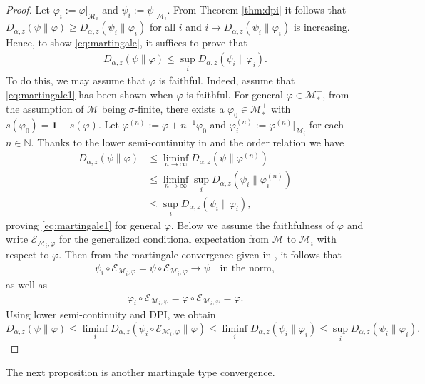 \documentclass[12pt]{article}
\theoremstyle{definition}
\theoremstyle{remark}
\numberwithin{equation}{section}
\def\cE{\mathcal E}
\def\cM{\mathcal M}
\def\ffi{\varphi}
\def\1{\mathbf{1}}
\def\bN{\mathbb{N}}
\begin{document}
\begin{proof}
Let $\ffi_i:=\ffi|_{\cM_i}$ and $\psi_i:=\psi|_{\cM_i}$. From Theorem \ref{thm:dpi} it follows that
$D_{\alpha,z}(\psi\|\ffi)\ge D_{\alpha,z}(\psi_i\|\ffi_i)$ for all $i$ and
$i\mapsto D_{\alpha,z}(\psi_i\|\ffi_i)$ is increasing. Hence, to show \eqref{eq:martingale}, it suffices to
prove that
\begin{align}\label{eq:martingale1}
D_{\alpha,z}(\psi\|\ffi)\le\sup_iD_{\alpha,z}(\psi_i\|\ffi_i).
\end{align}
To do this, we may assume that $\ffi$ is faithful. Indeed, assume that
\eqref{eq:martingale1} has been shown when $\ffi$ is
faithful. For general $\ffi\in\cM_*^+$, from the assumption of $\cM$ being $\sigma$-finite, there exists
a $\ffi_0\in\cM_*^+$ with $s(\ffi_0)=\1-s(\ffi)$. Let $\ffi^{(n)}:=\ffi+n^{-1}\ffi_0$ and
$\ffi_i^{(n)}:=\ffi^{(n)}|_{\cM_i}$ for each $n\in\bN$. Thanks to the lower semi-continuity in
\cite[Theorems 1(iv) and 2(iv)]{kato2023onrenyi} and the order relation
\cite[Theorems 1(iii) and 2(iii)]{kato2023onrenyi} we have
\begin{align*}
D_{\alpha,z}(\psi\|\ffi)&\le\liminf_{n\to\infty}D_{\alpha,z}(\psi\|\ffi^{(n)}) \\
&\le\liminf_{n\to\infty}\sup_iD_{\alpha,z}(\psi_i\|\ffi_i^{(n)}) \\
&\le\sup_iD_{\alpha,z}(\psi_i\|\ffi_i),
\end{align*}
proving \eqref{eq:martingale1} for general $\ffi$. Below we assume the faithfulness of $\ffi$ and write
$\cE_{\cM_i,\ffi}$ for the generalized conditional expectation from $\cM$ to $\cM_i$ with respect to $\ffi$. 
Then from the martingale convergence given in \cite[Theorem 3]{hiai1984strong}, it follows that
\begin{align}\label{eq:martingaleHT}
\psi_i\circ\cE_{\cM_i,\ffi}=\psi\circ\cE_{\cM_i,\ffi}\to\psi\quad\mbox{in the norm},
\end{align}
as well as
\begin{align}\label{eq:condexp}
\ffi_i\circ\cE_{\cM_i,\ffi}=\ffi\circ\cE_{\cM_i,\ffi}=\ffi.
\end{align}
Using lower semi-continuity and DPI, we obtain
\[
D_{\alpha,z}(\psi\|\ffi)\le \liminf_{i}
D_{\alpha,z}(\psi_i\circ\cE_{\cM_i,\varphi}\|\ffi)\le \liminf_i
D_{\alpha,z}(\psi_i\|\ffi_i)\le \sup_i D_{\alpha,z}(\psi_i\|\ffi_i).
\]
\end{proof}

The next proposition is another martingale type convergence.
\end{document}
